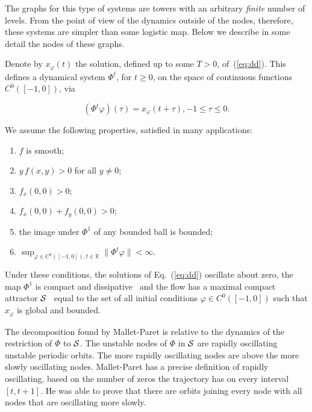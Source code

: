 \documentclass{article}
\def\gr{}
\def\phi{\varphi}
\def\cS{{\cal S}}
\begin{document}
The \gr graphs for this type of systems are towers with an arbitrary {\em finite} number of levels. 
From the point of view of the dynamics outside of the nodes, therefore, these systems are simpler than some logistic map. 
Below we describe in some detail the nodes of these graphs. 

Denote by $x_\phi(t)$ the solution, defined up to some $T>0$, of~(\ref{eq:dd}). This defines a dynamical system $\Phi^t$, for $t\geq0$, on the space of continuous functions $C^0([-1,0])$,
via 
\begin{linenomath}
\begin{equation*}
\left(\Phi^t\phi\right)(\tau) = x_\phi(t+\tau), -1\leq \tau\leq0.
\end{equation*}
\end{linenomath}
We assume the following properties, satisfied in many applications: 
\begin{enumerate}
\item $f$ is smooth; 
\item $y\,f(x,y)>0$ for all $y\neq0$; 
\item $f_x(0,0)>0$; 
\item $f_x(0,0)+f_y(0,0)>0$; 
\item the image under $\Phi^1$ of any bounded ball is bounded;
\item $\sup_{\phi\in C^0([-1,0]),t\in\mathbb R}\|\Phi^t\phi\|<\infty$.
\end{enumerate}

Under these conditions, the solutions of Eq.~(\ref{eq:dd}) oscillate about zero, the map $\Phi^1$ is compact and dissipative~\cite{HL72} and the flow has a maximal compact attractor ${\cal S}$~\cite{BLS70} equal to the set of all initial conditions $\phi\in C^0([-1,0])$ such that $x_\phi$ is global and bounded.

The decomposition found by Mallet-Paret is relative to the dynamics of the restriction of $\Phi$ to $\cS$.
The unstable nodes of $\Phi$ in $\cS$ are rapidly oscillating unstable periodic orbits. The more rapidly oscillating nodes are above the more slowly oscillating nodes. 
Mallet-Paret has a precise definition of rapidly oscillating, based on the number of zeros the trajectory has on every interval $[t,t+1]$.
He was able to prove that there are orbits joining every node with all nodes that are oscillating more slowly. 
    
\end{document}
